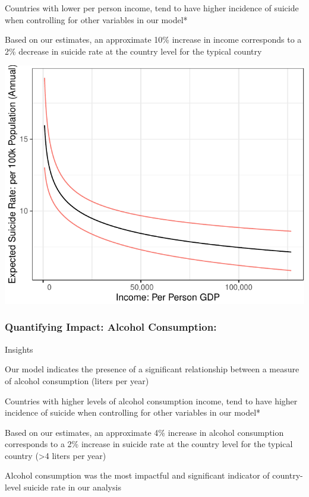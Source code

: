\documentclass[]{article}
\begin{document}
Countries with lower per person income, tend to have higher incidence of
suicide when controlling for other variables in our model*

Based on our estimates, an approximate 10\% increase in income
corresponds to a 2\% decrease in suicide rate at the country level for
the typical country

\begin{center}\includegraphics{Project_Report_files/figure-latex/agdp_plot-1} \end{center}

\subsubsection{Quantifying Impact: Alcohol
Consumption:}\label{quantifying-impact-alcohol-consumption}

Insights

Our model indicates the presence of a significant relationship between a
measure of alcohol consumption (liters per year)

Countries with higher levels of alcohol consumption income, tend to have
higher incidence of suicide when controlling for other variables in our
model*

Based on our estimates, an approximate 4\% increase in alcohol
consumption corresponds to a 2\% increase in suicide rate at the country
level for the typical country (\textgreater{}4 liters per year)

Alcohol consumption was the most impactful and significant indicator of
country-level suicide rate in our analysis
\end{document}

